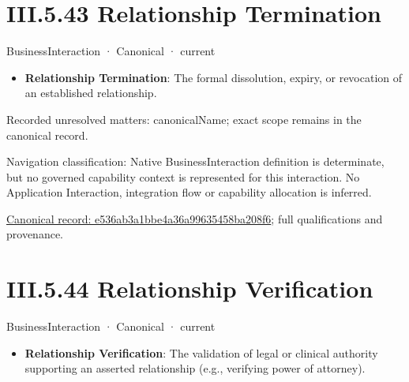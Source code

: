 \section*{III.5.43 Relationship Termination}
\label{navigation:III.5.43}

\label{element:e536ab3a1bbe4a36a99635458ba208f6}
{\small BusinessInteraction · Canonical · current}\par

\begin{itemize}


\item \textbf{Relationship Termination}: The formal dissolution, expiry, or revocation of an established relationship.

\end{itemize}

{\small Recorded unresolved matters: canonicalName; exact scope remains in the canonical record.}\par
{\small Navigation classification: Native BusinessInteraction definition is determinate, but no governed capability context is represented for this interaction. No Application Interaction, integration flow or capability allocation is inferred.}\par
{\footnotesize \href{../../../../continuum/business/business-interaction/e536ab3a1bbe4a36a99635458ba208f6.md}{Canonical record: e536ab3a1bbe4a36a99635458ba208f6}; full qualifications and provenance.}\par
\section*{III.5.44 Relationship Verification}
\label{navigation:III.5.44}

\label{element:c71453e1b0ff46a7b91e27a1745d842b}
{\small BusinessInteraction · Canonical · current}\par

\begin{itemize}


\item \textbf{Relationship Verification}: The validation of legal or clinical authority supporting an asserted relationship (e.g., verifying power of attorney).

\end{itemize}

